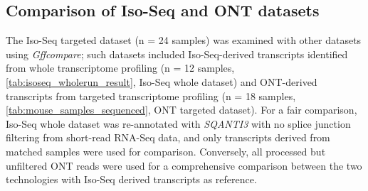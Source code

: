 \subsection{Comparison of Iso-Seq and ONT datasets}
The Iso-Seq targeted dataset (n = 24 samples) was examined with other datasets using \textit{Gffcompare}; such datasets included Iso-Seq-derived transcripts identified from whole transcriptome profiling (n = 12 samples, \cref{tab:isoseq_wholerun_result}, Iso-Seq whole dataset) and ONT-derived transcripts from targeted transcriptome profiling (n = 18 samples, \cref{tab:mouse_samples_sequenced}, ONT targeted dataset). For a fair comparison, Iso-Seq whole dataset was re-annotated with \textit{SQANTI3} with no splice junction filtering from short-read RNA-Seq data, and only transcripts derived from matched samples were used for comparison. Conversely, all processed but unfiltered ONT reads were used for a comprehensive comparison between the two technologies with Iso-Seq derived transcripts as reference. 

